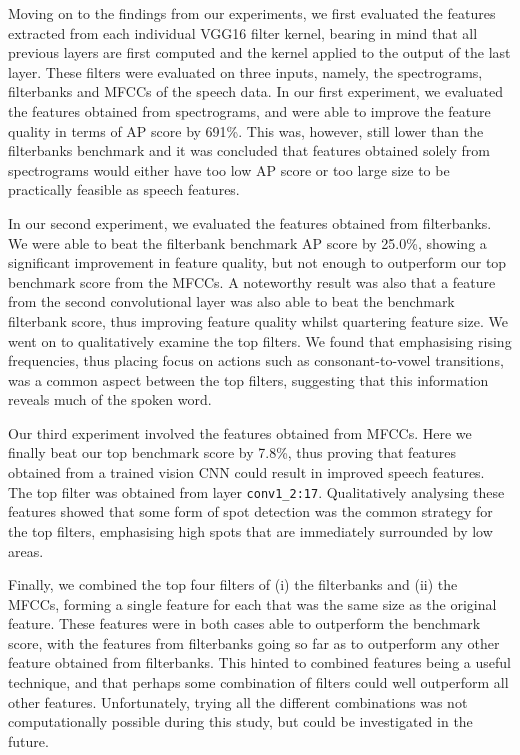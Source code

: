 Moving on to the findings from our experiments, we first evaluated the features extracted from each individual VGG16 filter kernel, bearing in mind that all previous layers are first computed and the kernel applied to the output of the last layer.
These filters were evaluated on three inputs, namely, the spectrograms, filterbanks and MFCCs of the speech data.
In our first experiment, we evaluated the features obtained from spectrograms, and were able to improve the feature quality in terms of AP score by 691\%.
This was, however, still lower than the filterbanks benchmark and it was concluded that features obtained solely from spectrograms would either have too low AP score or too large size to be practically feasible as speech features.

In our second experiment, we evaluated the features obtained from filterbanks. 
We were able to beat the filterbank benchmark AP score by 25.0\%, showing a significant improvement in feature quality, but not enough to outperform our top benchmark score from the MFCCs.
A noteworthy result was also that a feature from the second convolutional layer was also able to beat the benchmark filterbank score, thus improving feature quality whilst quartering feature size.
We went on to qualitatively examine the top filters.
We found that emphasising rising frequencies, thus placing focus on actions such as consonant-to-vowel transitions, was a common aspect between the top filters, suggesting that this information reveals much of the spoken word.

Our third experiment involved the features obtained from MFCCs. Here we finally beat our top benchmark score by 7.8\%, thus proving that features obtained from a trained vision CNN could result in improved speech features.
The top filter was obtained from layer \texttt{conv1\_2:17}.
Qualitatively analysing these features showed that some form of spot detection was the common strategy for the top filters, emphasising high spots that are immediately surrounded by low areas.

Finally, we combined the top four filters of (i) the filterbanks and (ii) the MFCCs, forming a single feature for each that was the same size as the original feature.
These features were in both cases able to outperform the benchmark score, with the features from filterbanks going so far as to outperform any other feature obtained from filterbanks.
This hinted to combined features being a useful technique, and that perhaps some combination of filters could well outperform all other features.
Unfortunately, trying all the different combinations was not computationally possible during this study, but could be investigated in the future.

